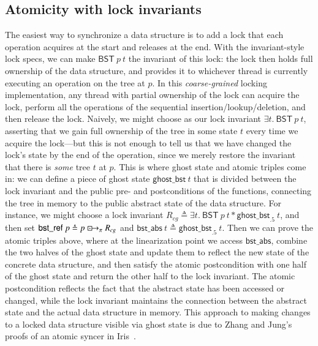 \documentclass[runningheads]{llncs}
\newcommand{\islock}{\boxdotright}
\newcommand{\treerep}{\ensuremath{\mathsf{bst\_abs}}}
\newcommand{\nodeboxrep}{\ensuremath{\mathsf{bst\_ref}}}
\begin{document}
\subsection{Atomicity with lock invariants}%
The easiest way to synchronize a data structure is to add a lock that each operation acquires at the start and releases at the end. With the invariant-style lock specs, we can make $\mathsf{BST}\ p\ t$ the invariant of this lock: the lock then holds full ownership of the data structure, and provides it to whichever thread is currently executing an operation on the tree at $p$.
In this \emph{coarse-grained} locking implementation, any thread with partial ownership of the lock can acquire the lock, perform all the operations of the sequential insertion/lookup/deletion, and then release the lock. Naively, we might choose as our lock invariant $\exists t.\ \mathsf{BST}\ p\ t$, asserting that we gain full ownership of the tree in some state $t$ every time we acquire the lock---but this is not enough to tell us that we have changed the lock's state by the end of the operation, since we merely restore the invariant that there is \emph{some} tree $t$ at $p$. This is where ghost state and atomic triples come in: we can define a piece of ghost state $\mathsf{ghost\_bst}\ t$ that is divided between the lock invariant and the public pre- and postconditions of the functions, connecting the tree in memory to the public abstract state of the data structure. For instance, we might choose a lock invariant $R_{\mathit{cg}} \triangleq \exists t.\ \mathsf{BST}\ p\ t * \mathsf{ghost\_bst}_{.5}\ t$, and then set $\nodeboxrep\ p \triangleq p \islock_\pi R_{\mathit{cg}}$ and $\treerep\ t \triangleq \mathsf{ghost\_bst}_{.5}\ t$. %
Then we can prove the atomic triples above, where at the linearization point we access $\treerep$, combine the two halves of the ghost state and update them to reflect the new state of the concrete data structure, and then satisfy the atomic postcondition with one half of the ghost state and return the other half to the lock invariant. The atomic postcondition reflects the fact that the abstract state has been accessed or changed, while the lock invariant maintains the connection between the abstract state and the actual data structure in memory. This approach to making changes to a locked data structure visible via ghost state is due to Zhang and Jung's proofs of an atomic syncer in Iris~\cite{atomic-syncer}.%
\end{document}
